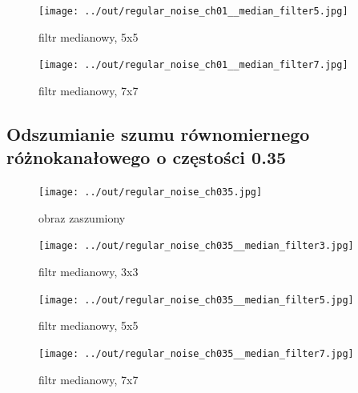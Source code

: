 \documentclass[a4paper,12pt]{article}
\begin{document}
\begin{figure}[h!]
\begin{minipage}[t]{7.5cm}
\begin{center}
\texttt{[image: ../out/regular\_noise\_ch01\_\_median\_filter5.jpg]}
\caption{filtr medianowy, 5x5}
\end{center}
\end{minipage}
\hfill
\begin{minipage}[t]{7.5cm}
\begin{center}
\texttt{[image: ../out/regular\_noise\_ch01\_\_median\_filter7.jpg]}
\caption{filtr medianowy, 7x7}
\end{center}
\end{minipage}
\end{figure}


\newpage
\subsection{Odszumianie szumu równomiernego różnokanałowego o częstości 0.35}
\begin{figure}[h!]
\begin{minipage}[t]{7.5cm}
\begin{center}
\texttt{[image: ../out/regular\_noise\_ch035.jpg]}
\caption{obraz zaszumiony}
\end{center}
\end{minipage}
\hfill
\begin{minipage}[t]{7.5cm}
\begin{center}
\texttt{[image: ../out/regular\_noise\_ch035\_\_median\_filter3.jpg]}
\caption{filtr medianowy, 3x3}
\end{center}
\end{minipage}
\end{figure}

\begin{figure}[h!]
\begin{minipage}[t]{7.5cm}
\begin{center}
\texttt{[image: ../out/regular\_noise\_ch035\_\_median\_filter5.jpg]}
\caption{filtr medianowy, 5x5}
\end{center}
\end{minipage}
\hfill
\begin{minipage}[t]{7.5cm}
\begin{center}
\texttt{[image: ../out/regular\_noise\_ch035\_\_median\_filter7.jpg]}
\caption{filtr medianowy, 7x7}
\end{center}
\end{minipage}
\end{figure}
\end{document}
